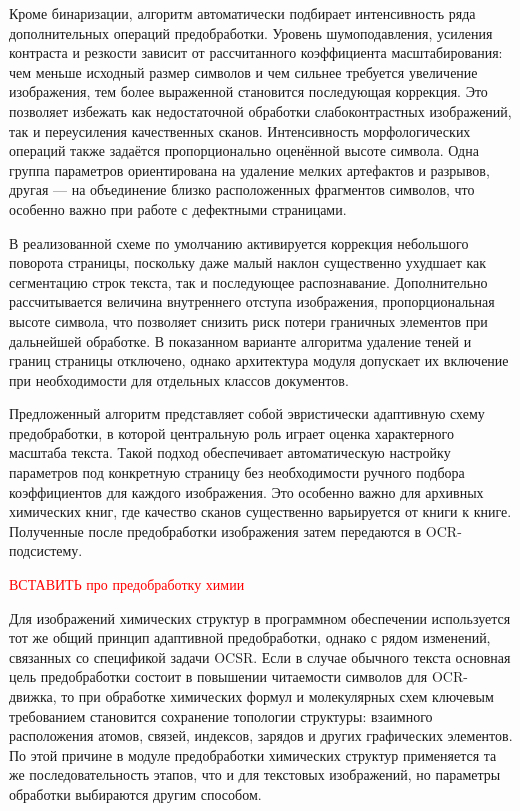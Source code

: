 Кроме бинаризации, алгоритм автоматически подбирает интенсивность ряда дополнительных операций предобработки. Уровень шумоподавления, усиления контраста и резкости зависит от рассчитанного коэффициента масштабирования: чем меньше исходный размер символов и чем сильнее требуется увеличение изображения, тем более выраженной становится последующая коррекция. Это позволяет избежать как недостаточной обработки слабоконтрастных изображений, так и переусиления качественных сканов. Интенсивность морфологических операций также задаётся пропорционально оценённой высоте символа. Одна группа параметров ориентирована на удаление мелких артефактов и разрывов, другая --- на объединение близко расположенных фрагментов символов, что особенно важно при работе с дефектными страницами.

В реализованной схеме по умолчанию активируется коррекция небольшого поворота страницы, поскольку даже малый наклон существенно ухудшает как сегментацию строк текста, так и последующее распознавание. Дополнительно рассчитывается величина внутреннего отступа изображения, пропорциональная высоте символа, что позволяет снизить риск потери граничных элементов при дальнейшей обработке. В показанном варианте алгоритма удаление теней и границ страницы отключено, однако архитектура модуля допускает их включение при необходимости для отдельных классов документов.

Предложенный алгоритм представляет собой эвристически адаптивную схему предобработки, в которой центральную роль играет оценка характерного масштаба текста. Такой подход обеспечивает автоматическую настройку параметров под конкретную страницу без необходимости ручного подбора коэффициентов для каждого изображения. Это особенно важно для архивных химических книг, где качество сканов существенно варьируется от книги к книге. Полученные после предобработки изображения затем передаются в OCR-подсистему.

\textcolor{red}{ВСТАВИТЬ про предобработку химии}

Для изображений химических структур в программном обеспечении используется тот же общий принцип адаптивной предобработки, однако с рядом изменений, связанных со спецификой задачи OCSR. Если в случае обычного текста основная цель предобработки состоит в повышении читаемости символов для OCR-движка, то при обработке химических формул и молекулярных схем ключевым требованием становится сохранение топологии структуры: взаимного расположения атомов, связей, индексов, зарядов и других графических элементов. По этой причине в модуле предобработки химических структур применяется та же последовательность этапов, что и для текстовых изображений, но параметры обработки выбираются другим способом.

